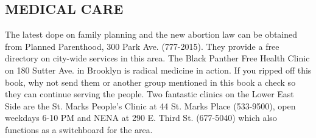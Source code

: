 \documentclass[11pt,twoside,a4paper]{book}
\begin{document}
\subsection{MEDICAL CARE}
The latest dope on family planning and the new abortion law can be obtained from Planned Parenthood, 300 Park Ave. (777-2015). They provide a free directory on city-wide services in this area. The Black Panther Free Health Clinic on 180 Sutter Ave. in Brooklyn is radical medicine in action. If you ripped off this book, why not send them or another group mentioned in this book a check so they can continue serving the people. Two fantastic clinics on the Lower East Side are the St. Marks People's Clinic at 44 St. Marks Place (533-9500), open weekdays 6-10 PM and NENA at 290 E. Third St. (677-5040) which also functions as a switchboard for the area.~\\
\end{document}
